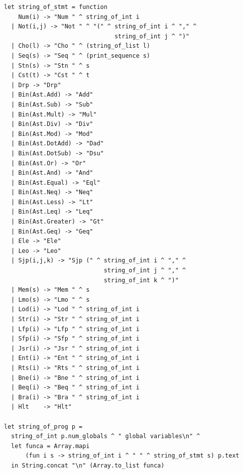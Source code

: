 \documentclass[12pt,A4]{book}
\begin{document}
\begin{verbatim}
let string_of_stmt = function
    Num(i) -> "Num " ^ string_of_int i
  | Not(i,j) -> "Not " ^ "(" ^ string_of_int i ^ "," ^ 
                               string_of_int j ^ ")"
  | Cho(l) -> "Cho " ^ (string_of_list l)
  | Seq(s) -> "Seq " ^ (print_sequence s)
  | Stn(s) -> "Stn " ^ s
  | Cst(t) -> "Cst " ^ t
  | Drp -> "Drp"
  | Bin(Ast.Add) -> "Add"
  | Bin(Ast.Sub) -> "Sub"
  | Bin(Ast.Mult) -> "Mul"
  | Bin(Ast.Div) -> "Div"
  | Bin(Ast.Mod) -> "Mod"
  | Bin(Ast.DotAdd) -> "Dad"
  | Bin(Ast.DotSub) -> "Dsu"
  | Bin(Ast.Or) -> "Or"
  | Bin(Ast.And) -> "And"
  | Bin(Ast.Equal) -> "Eql"
  | Bin(Ast.Neq) -> "Neq"
  | Bin(Ast.Less) -> "Lt"
  | Bin(Ast.Leq) -> "Leq"
  | Bin(Ast.Greater) -> "Gt"
  | Bin(Ast.Geq) -> "Geq"
  | Ele -> "Ele"
  | Leo -> "Leo"
  | Sjp(i,j,k) -> "Sjp (" ^ string_of_int i ^ "," ^ 
                            string_of_int j ^ "," ^ 
                            string_of_int k ^ ")"
  | Mem(s) -> "Mem " ^ s
  | Lmo(s) -> "Lmo " ^ s
  | Lod(i) -> "Lod " ^ string_of_int i
  | Str(i) -> "Str " ^ string_of_int i
  | Lfp(i) -> "Lfp " ^ string_of_int i
  | Sfp(i) -> "Sfp " ^ string_of_int i
  | Jsr(i) -> "Jsr " ^ string_of_int i
  | Ent(i) -> "Ent " ^ string_of_int i
  | Rts(i) -> "Rts " ^ string_of_int i
  | Bne(i) -> "Bne " ^ string_of_int i
  | Beq(i) -> "Beq " ^ string_of_int i
  | Bra(i) -> "Bra " ^ string_of_int i
  | Hlt    -> "Hlt"

let string_of_prog p =
  string_of_int p.num_globals ^ " global variables\n" ^
  let funca = Array.mapi
      (fun i s -> string_of_int i ^ " " ^ string_of_stmt s) p.text
  in String.concat "\n" (Array.to_list funca)
\end{verbatim}
\end{document}
